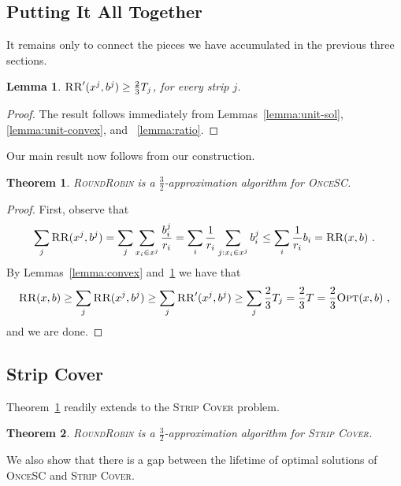 \documentclass[11pt]{article}
\newtheorem{lemma}{Lemma}
\newtheorem{theorem}{Theorem}
\newcommand{\inv}[1]{\frac{1}{#1}}
\newcommand{\strip}{\textsc{Strip Cover}\xspace}
\newcommand{\sosc}{\textsc{OnceSC}\xspace}
\newcommand{\rr}{\textsc{RoundRobin}\xspace}
\newcommand{\RR}{\textsc{RR}\xspace}
\newcommand{\opt}{\textsc{Opt}\xspace}
\begin{document}
\subsection{Putting It All Together}

It remains only to connect the pieces we have accumulated in the previous three sections. 

\begin{lemma}
\label{lemma:strip}
$\RR'(x^j,b^j) \geq \frac{2}{3} T_j$, for every strip $j$.  
\end{lemma}

\begin{proof}
The result follows immediately from Lemmas~\ref{lemma:unit-sol},
\ref{lemma:unit-convex}, and ~\ref{lemma:ratio}.
\end{proof}

Our main result now follows from our construction. 

\begin{theorem}
\label{thm:main}
\rr is a $\frac{3}{2}$-approximation algorithm for \sosc.
\end{theorem}
\begin{proof}
First, observe that 
\[\sum_j \RR(x^j,b^j) 
=    \sum_j \sum_{x_i \in x^j} \frac{b^j_i}{r_i}
=    \sum_i \inv{r_i} \sum_{j : x_i \in x^j} b^j_i
\leq \sum_i \inv{r_i} b_i 
=    \RR(x,b)
~.
\]
By Lemmas~\ref{lemma:convex} and~\ref{lemma:strip} we have that
\[
\RR(x,b) 
\geq \sum_j \RR(x^j,b^j)
\geq \sum_j \RR'(x^j,b^j)
\geq \sum_j \frac{2}{3} T_j
=    \frac{2}{3} T
=    \frac{2}{3} \opt(x,b)
~,
\]
and we are done.
\end{proof}




\subsection{Strip Cover}


Theorem~\ref{thm:main} readily extends to the \strip problem. 

\begin{theorem}
\rr is a $\frac{3}{2}$-approximation algorithm for \strip.
\end{theorem}


\iffalse 

We also show that there is a gap between the lifetime of optimal
solutions of \sosc and \strip.
\end{document}
